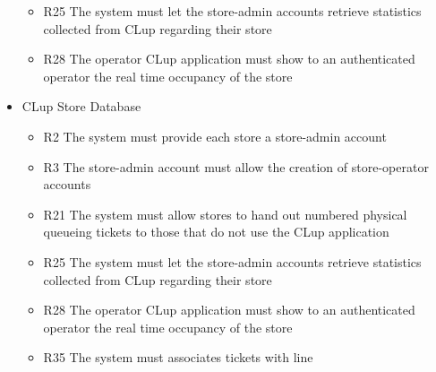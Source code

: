 \begin{itemize}
\begin{itemize}
        \item R25 The system must let the store-admin accounts retrieve statistics collected from CLup regarding their store
        \item R28 The operator CLup application must show to an authenticated operator the real time occupancy of the store
    \end{itemize}
    \item CLup Store Database
    \begin{itemize}
        \item R2 The system must provide each store a store-admin account
        \item R3 The store-admin account must allow the creation of store-operator accounts
        \item R21 The system must allow stores to hand out numbered physical queueing tickets to those that do not use the CLup application
        \item R25 The system must let the store-admin accounts retrieve statistics collected from CLup regarding their store
        \item R28 The operator CLup application must show to an authenticated operator the real time occupancy of the store
        \item R35 The system must associates tickets with line 
    \end{itemize}
\end{itemize}